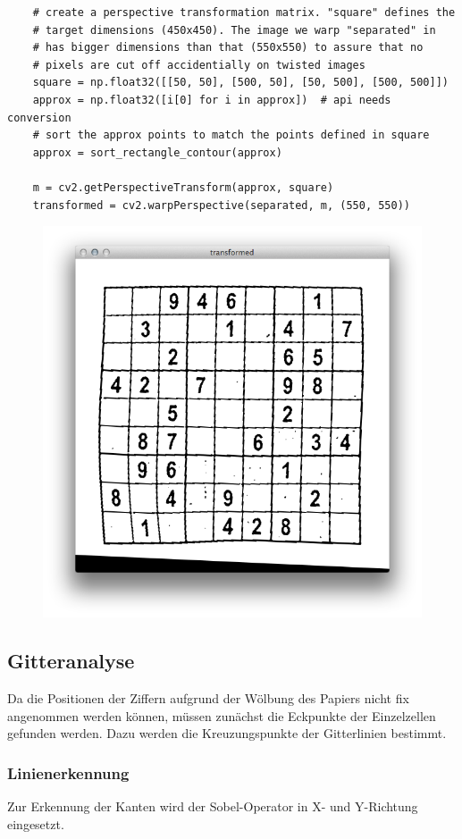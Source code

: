 \begin{lstlisting}
    # create a perspective transformation matrix. "square" defines the
    # target dimensions (450x450). The image we warp "separated" in
    # has bigger dimensions than that (550x550) to assure that no
    # pixels are cut off accidentially on twisted images
    square = np.float32([[50, 50], [500, 50], [50, 500], [500, 500]])
    approx = np.float32([i[0] for i in approx])  # api needs conversion
    # sort the approx points to match the points defined in square
    approx = sort_rectangle_contour(approx)

    m = cv2.getPerspectiveTransform(approx, square)
    transformed = cv2.warpPerspective(separated, m, (550, 550))
\end{lstlisting}

\begin{figure}[H]
    \begin{center}
        \includegraphics[width=.5\textwidth]{Abbildungen/transformed}
    \end{center}
\end{figure}


\subsection{Gitteranalyse}
Da die Positionen der Ziffern aufgrund der Wölbung des Papiers nicht fix angenommen werden können, müssen zunächst die Eckpunkte der Einzelzellen gefunden werden.
Dazu werden die Kreuzungspunkte der Gitterlinien bestimmt.

\subsubsection{Linienerkennung}
Zur Erkennung der Kanten wird der Sobel-Operator in X- und Y-Richtung eingesetzt.

